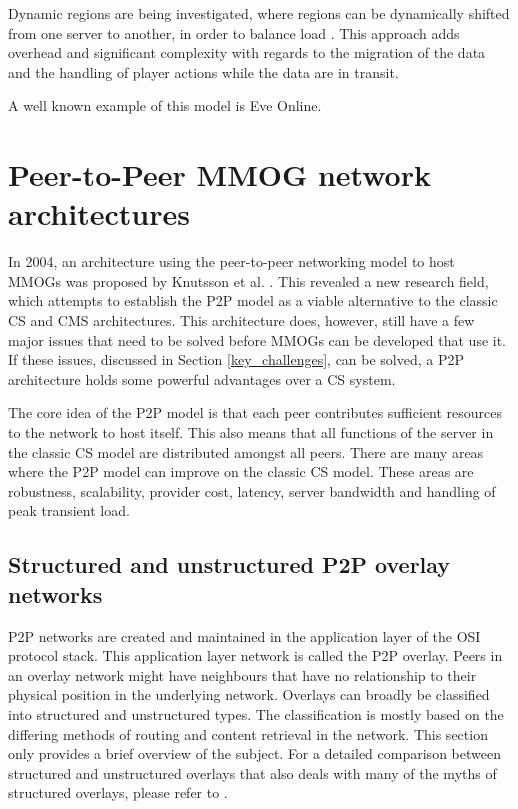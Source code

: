 \documentclass[10pt,a4paper,journal,cspaper,compsoc]{IEEEtran}
\begin{document}
Dynamic regions are being investigated, where regions can be dynamically shifted from one server to another, in order to balance load
\cite{zone_based_dyn}. This approach adds overhead and significant complexity with regards to the migration of the data and the handling of player
actions while the data are in transit.

A well known example of this model is Eve Online.

\section{Peer-to-Peer MMOG network architectures}
\label{p2p_network_architectures}

In 2004, an architecture using the peer-to-peer networking model to host MMOGs was proposed by Knutsson et al. \cite{knutsson_p2p_first}. This
revealed a new research field, which attempts to establish the P2P model as a viable alternative to the classic \ac{CS} and \ac{CMS} architectures.
This architecture does, however, still have a few major issues that need to be solved before MMOGs can be developed that use it. If these issues,
discussed in Section \ref{key_challenges}, can be solved, a \ac{P2P} architecture holds some powerful advantages over a \ac{CS} system.

The core idea of the \ac{P2P} model is that each peer contributes sufficient resources to the network to host itself. This also means that all
functions of the server in the classic \ac{CS} model are distributed amongst all peers. There are many areas where the \ac{P2P} model can improve on
the classic \ac{CS} model. These areas are robustness, scalability, provider cost, latency, server bandwidth and handling of peak transient load.

\subsection{Structured and unstructured P2P overlay networks}
\label{overlays}

P2P networks are created and maintained in the application layer of the OSI protocol stack. This application layer network is called the P2P overlay.
Peers in an overlay network might have neighbours that have no relationship to their physical position in the underlying network. Overlays can
broadly be classified into structured and unstructured types. The classification is mostly based on the differing methods of routing and content
retrieval in the network. This section only provides a brief overview of the subject. For a detailed comparison between structured and unstructured
overlays that also deals with many of the myths of structured overlays, please refer to \cite{Castro_structured_overlay_myths}.
\end{document}
